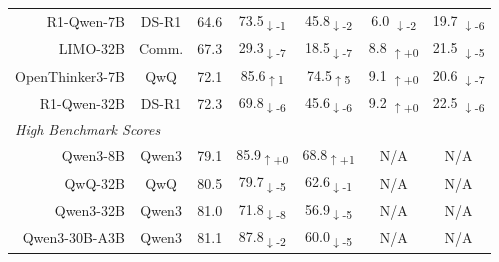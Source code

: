 \documentclass{article} %
\begin{document}
\begin{table}[t]
\begin{tabular}{r|c|c|cc|cc}
    R1-Qwen-7B      & DS-R1 & 64.6 &
    \cellcolor{red!11}73.5\textsubscript{$\downarrow$-1} & 
    \cellcolor{red!12}45.8\textsubscript{$\downarrow$-2} & 
    \cellcolor{red!12} 6.0 \textsubscript{$\downarrow$-2}& 
    \cellcolor{red!16} 19.7 \textsubscript{$\downarrow$-6} \\
    
    LIMO-32B                &  Comm. & 67.3 & \cellcolor{red!27}29.3\textsubscript{$\downarrow$-7} & \cellcolor{red!27}18.5\textsubscript{$\downarrow$-7} & 
    \cellcolor{green!0} 8.8 \textsubscript{$\uparrow$+0} & 
    \cellcolor{red!15} 21.5 \textsubscript{$\downarrow$-5} \\
    
    OpenThinker3-7B         & QwQ & 72.1 & \cellcolor{green!11}85.6\textsubscript{$\uparrow$1} & 
    \cellcolor{green!15}74.5\textsubscript{$\uparrow$5} &
    \cellcolor{green!0} 9.1 \textsubscript{$\uparrow$+0} &
    \cellcolor{red!27} 20.6 \textsubscript{$\downarrow$-7} \\
    
    R1-Qwen-32B     & DS-R1 & 72.3 & \cellcolor{red!16}69.8\textsubscript{$\downarrow$-6} & \cellcolor{red!16}45.6\textsubscript{$\downarrow$-6} & 
    \cellcolor{green!0} 9.2 \textsubscript{$\uparrow$+0} &
    \cellcolor{red!16} 22.5 \textsubscript{$\downarrow$-6} \\
    
    \midrule
    \multicolumn{7}{l}{\textit{High Benchmark Scores}} \\
    \midrule
    
    Qwen3-8B                & Qwen3 & 79.1 & \cellcolor{green!0}85.9\textsubscript{$\uparrow$+0} & \cellcolor{green!11}68.8\textsubscript{$\uparrow$+1} & N/A & N/A \\
    
    QwQ-32B                 & QwQ & 80.5 & \cellcolor{red!15}79.7\textsubscript{$\downarrow$-5} & \cellcolor{red!11}62.6\textsubscript{$\downarrow$-1} & N/A & N/A \\
    
    Qwen3-32B               & Qwen3 & 81.0 & \cellcolor{red!28}71.8\textsubscript{$\downarrow$-8} & \cellcolor{red!15}56.9\textsubscript{$\downarrow$-5} & N/A & N/A \\
    
    Qwen3-30B-A3B           & Qwen3 & 81.1 & \cellcolor{red!12}87.8\textsubscript{$\downarrow$-2} & \cellcolor{red!15}60.0\textsubscript{$\downarrow$-5} & N/A & N/A \\
    

\end{tabular}
\end{table}
\end{document}
